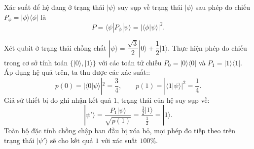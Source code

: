 \begin{corollary}
\label{cor:born}
Xác suất để hệ đang ở trạng thái $|\psi\rangle$ suy sụp về trạng thái $|\phi\rangle$
sau phép đo chiếu $P_\phi = |\phi\rangle\langle\phi|$ là
$$P = \langle\psi|P_\phi|\psi\rangle = |\langle\phi|\psi\rangle|^2.$$
\end{corollary}

\begin{example}
Xét qubit ở trạng thái chồng chất $|\psi\rangle = \dfrac{\sqrt{3}}{2}|0\rangle
+ \dfrac{1}{2}|1\rangle$. Thực hiện phép đo chiếu trong cơ sở tính toán $\{|0\rangle, |1\rangle\}$ với các toán tử chiếu $P_0 = |0\rangle\langle 0|$ và $P_1 = |1\rangle\langle 1|$. Áp dụng hệ quả trên, ta thu được các xác suất::
$$p(0) = |\langle 0|\psi\rangle|^2 = \frac{3}{4}, \qquad
  p(1) = |\langle 1|\psi\rangle|^2 = \frac{1}{4}.$$
Giả sử thiết bị đo ghi nhận kết quả $1$, trạng thái của hệ suy sụp về:
$$|\psi'\rangle = \frac{P_1|\psi\rangle}{\sqrt{p(1)}}
= \frac{\tfrac{1}{2}|1\rangle}{\tfrac{1}{2}} = |1\rangle.$$
Toàn bộ đặc tính chồng chập ban đầu bị xóa bỏ, mọi phép đo tiếp theo trên trạng thái $|\psi'\rangle$ sẽ cho kết quả $1$ với xác suất $100\%$.
\end{example}


